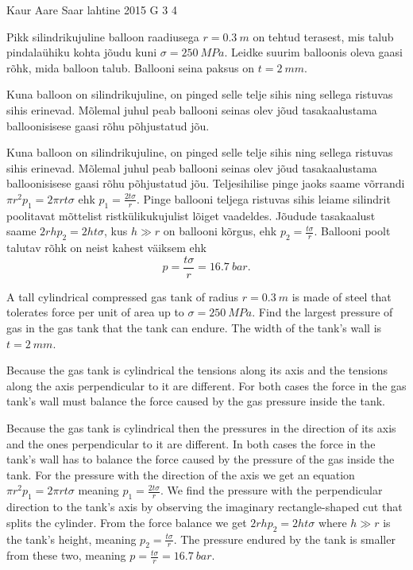 {Kaur Aare Saar} %
{lahtine} %
{2015} %
{G 3} %
{4} %
{
\ifStatement
Pikk silindrikujuline balloon raadiusega $r=\SI{0,3}{m}$ on tehtud terasest, mis talub pindalaühiku kohta jõudu kuni $\sigma=\SI{250}{MPa}$. Leidke suurim balloonis oleva gaasi rõhk, mida balloon talub. Ballooni seina paksus on $t=\SI{2}{mm}$.
\fi


\ifHint
Kuna balloon on silindrikujuline, on pinged selle telje sihis ning sellega ristuvas sihis erinevad. Mõlemal juhul peab ballooni seinas olev jõud tasakaalustama balloonisisese gaasi rõhu põhjustatud jõu.
\fi


\ifSolution
Kuna balloon on silindrikujuline, on pinged selle telje sihis ning sellega ristuvas sihis erinevad. Mõlemal juhul peab ballooni seinas olev jõud tasakaalustama balloonisisese gaasi rõhu põhjustatud jõu. Teljesihilise pinge jaoks saame võrrandi $\pi r^2 p_1=2\pi rt\sigma$ ehk $p_1=\frac{2t\sigma}{r}$. Pinge ballooni teljega ristuvas sihis leiame silindrit poolitavat mõttelist ristkülikukujulist lõiget vaadeldes. Jõudude tasakaalust saame $2rhp_2=2ht\sigma$, kus $h\gg r$ on ballooni kõrgus, ehk $p_2=\frac{t\sigma}{r}$. Ballooni poolt talutav rõhk on neist kahest väiksem ehk
\[
p=\frac{t\sigma}{r}=\SI{16,7}{bar}.
\]
\fi


\ifEngStatement
A tall cylindrical compressed gas tank of radius $r=\SI{0,3}{m}$ is made of steel that tolerates force per unit of area up to $\sigma=\SI{250}{MPa}$. Find the largest pressure of gas in the gas tank that the tank can endure. The width of the tank’s wall is $t=\SI{2}{mm}$.
\fi


\ifEngHint
Because the gas tank is cylindrical the tensions along its axis and the tensions along the axis perpendicular to it are different. For both cases the force in the gas tank’s wall must balance the force caused by the gas pressure inside the tank.
\fi


\ifEngSolution
Because the gas tank is cylindrical then the pressures in the direction of its axis and the ones perpendicular to it are different. In both cases the force in the tank’s wall has to balance the force caused by the pressure of the gas inside the tank. For the pressure with the direction of the axis we get an equation $\pi r^2 p_1=2\pi rt\sigma$ meaning $p_1=\frac{2t\sigma}{r}$. We find the pressure with the perpendicular direction to the tank’s axis by observing the imaginary rectangle-shaped cut that splits the cylinder. From the force balance we get $2rhp_2=2ht\sigma$ where $h\gg r$ is the tank’s height, meaning $p_2=\frac{t\sigma}{r}$. The pressure endured by the tank is smaller from these two, meaning $p=\frac{t\sigma}{r}=\SI{16,7}{bar}$.
\fi
}